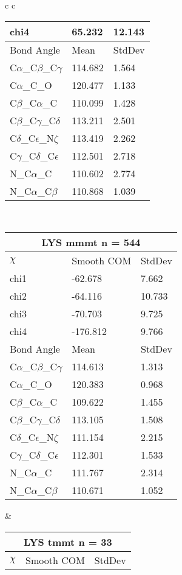 \begin{longtable}{ c c }
\begin{tabular}{ l l l }
  chi4 & 65.232 & 12.143 \\ \midrule
  Bond Angle   & Mean     & StdDev \\ \midrule
  C$\alpha$\_C$\beta$\_C$\gamma$ & 114.682 & 1.564\\
  C$\alpha$\_C\_O & 120.477 & 1.133\\
  C$\beta$\_C$\alpha$\_C & 110.099 & 1.428\\
  C$\beta$\_C$\gamma$\_C$\delta$ & 113.211 & 2.501\\
  C$\delta$\_C$\epsilon$\_N$\zeta$ & 113.419 & 2.262\\
  C$\gamma$\_C$\delta$\_C$\epsilon$ & 112.501 & 2.718\\
  N\_C$\alpha$\_C & 110.602 & 2.774\\
  N\_C$\alpha$\_C$\beta$ & 110.868 & 1.039\\
  \bottomrule
  \end{tabular}
  \\
  \begin{tabular}{ l l l }
  \toprule
  \multicolumn{3}{c}{LYS \textbf{mmmt} n = 544} \\ \toprule
  $\chi$       & Smooth COM & StdDev \\ \midrule
  chi1 & -62.678 & 7.662 \\ 
  chi2 & -64.116 & 10.733 \\ 
  chi3 & -70.703 & 9.725 \\ 
  chi4 & -176.812 & 9.766 \\ \midrule
  Bond Angle   & Mean     & StdDev \\ \midrule
  C$\alpha$\_C$\beta$\_C$\gamma$ & 114.613 & 1.313\\
  C$\alpha$\_C\_O & 120.383 & 0.968\\
  C$\beta$\_C$\alpha$\_C & 109.622 & 1.455\\
  C$\beta$\_C$\gamma$\_C$\delta$ & 113.105 & 1.508\\
  C$\delta$\_C$\epsilon$\_N$\zeta$ & 111.154 & 2.215\\
  C$\gamma$\_C$\delta$\_C$\epsilon$ & 112.301 & 1.533\\
  N\_C$\alpha$\_C & 111.767 & 2.314\\
  N\_C$\alpha$\_C$\beta$ & 110.671 & 1.052\\
  \bottomrule
  \end{tabular}
  &
  \begin{tabular}{ l l l }
  \toprule
  \multicolumn{3}{c}{LYS \textbf{tmmt} n = 33} \\ \toprule
  $\chi$       & Smooth COM & StdDev \\ \midrule

\end{tabular}
\end{longtable}
